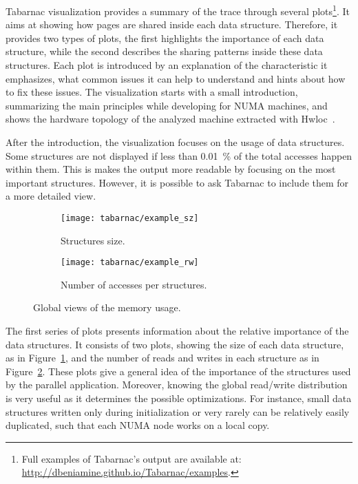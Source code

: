 \gls{Tabarnac} visualization provides a summary of the trace through several plots\footnote{
    Full examples of \gls{Tabarnac}'s output are available at:\\ \url{http://dbeniamine.github.io/Tabarnac/examples}.}.
It aims at showing how pages are shared inside each data structure.
Therefore, it provides two types of plots, the first highlights the importance of each data structure, while the second describes the sharing patterns inside these data structures.
Each plot is introduced by an explanation of the characteristic it emphasizes, what common issues it can help to understand and hints about how to fix these issues.
The visualization starts with a small introduction, summarizing the main principles while developing for \gls{NUMA} machines, and shows the hardware topology of the analyzed machine extracted
with Hwloc~\cite{Broquedis10hwloc}.

After the introduction, the visualization focuses on the usage of data structures.
Some structures are not displayed if less than \SI{0.01}{\%} of the total accesses happen within them.
This is makes the output more readable by focusing on the most important structures.
However, it is possible to ask \gls{Tabarnac} to include them for a more detailed view.

\begin{figure}[htb]
    \centering
    \begin{subfigure}{.49\linewidth}
        \texttt{[image: tabarnac/example\_sz]}
        \caption{Structures size.}
        \label{fig:example_sz}
    \end{subfigure}
    \begin{subfigure}{.49\linewidth}
        \texttt{[image: tabarnac/example\_rw]}
        \caption{Number of accesses per structures.}
        \label{fig:example_rw}
    \end{subfigure}
    \caption{Global views of the memory usage.}
    \label{fig:example_plot1}
\end{figure}

The first series of plots presents information about the relative importance of the data structures.
It consists of two plots, showing the size of each data structure, as in Figure~\ref{fig:example_sz}, and the number of reads and writes in each structure as in Figure~\ref{fig:example_rw}.
These plots give a general idea of the importance of the structures used by the parallel application.
Moreover, knowing the global read/write distribution is very useful as it determines the possible optimizations.
For instance, small data structures written only during initialization or very rarely can be relatively easily
duplicated, such that each \gls{NUMA} node works on a local copy.

